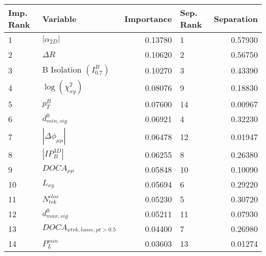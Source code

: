 \begin{tabular}{llrlr}
\hline \hline
Imp. Rank &                     Variable &  Importance & Sep. Rank &  Separation \\
\midrule

        1 &              $|\alpha_{2D}|$ &     0.13780 &         1 &     0.57930 \\
        2 &                   $\Delta R$ &     0.10620 &         2 &     0.56750 \\
        3 &  B Isolation $(I^{B}_{0.7})$ &     0.10270 &         3 &     0.43390 \\
        4 &      $\log{(\chi^{2}_{xy})}$ &     0.08076 &         9 &     0.18830 \\
        5 &                    $p^B_{T}$ &     0.07600 &        14 &     0.00967 \\
        6 &             $d^0_{min, sig}$ &     0.06921 &         4 &     0.32230 \\
        7 &     $|\Delta \phi_{\mu\mu}|$ &     0.06478 &        12 &     0.01947 \\
        8 &              $|IP_{B}^{3D}|$ &     0.06255 &         8 &     0.26380 \\
        9 &              $DOCA_{\mu\mu}$ &     0.05848 &        10 &     0.10090 \\
       10 &                     $L_{xy}$ &     0.05694 &         6 &     0.29220 \\
       11 &             $N^{clos}_{trk}$ &     0.05230 &         5 &     0.30720 \\
       12 &             $d^0_{max, sig}$ &     0.05211 &        11 &     0.07930 \\
       13 &   $DOCA_{xtrk,loose,pt>0.5}$ &     0.04400 &         7 &     0.26980 \\
       14 &                $P^{min}_{L}$ &     0.03603 &        13 &     0.01274 \\
\hline \hline
\end{tabular}
